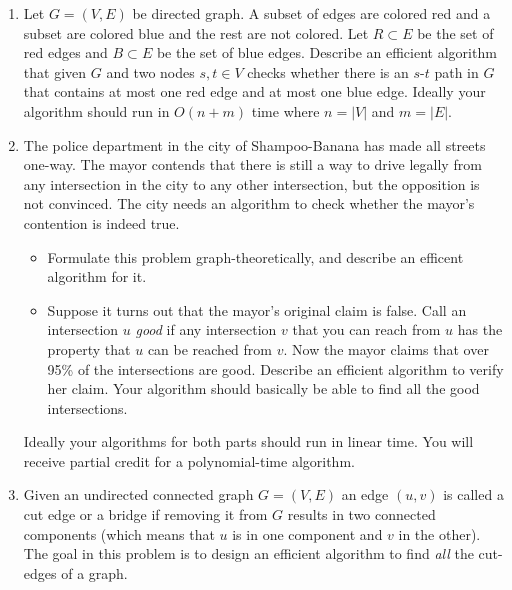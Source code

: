 \documentclass[11pt]{article}
\begin{document}
\begin{enumerate}


\item Let $G=(V,E)$ be directed graph. A subset of edges are colored
  red and a subset are colored blue and the rest are not colored.  Let
  $R \subset E$ be the set of red edges and $B \subset E$ be the set
  of blue edges.  Describe an efficient algorithm that given $G$ and
  two nodes $s,t \in V$ checks whether there is an $s$-$t$ path in $G$
  that contains at most one red edge and at most one blue edge. Ideally
  your algorithm should run in $O(n+m)$ time where $n = |V|$ and $m = |E|$.

\item The police department in the city of Shampoo-Banana has made all
  streets one-way. The mayor contends that there is still a way to
  drive legally from any intersection in the city to any other
  intersection, but the opposition is not convinced. The city needs an
  algorithm to check whether the mayor's contention is indeed true.
\begin{itemize}
\item Formulate this problem graph-theoretically, and
describe an efficent algorithm for it.
\item Suppose it turns out that the mayor’s original claim is
  false. Call an intersection $u$ {\em good} if any intersection $v$
  that you can reach from $u$ has the property that $u$ can be reached 
  from $v$. Now the mayor claims that over 95\% of the
  intersections are good.  Describe an efficient algorithm to verify
  her claim. Your algorithm should basically be able to find all the
  good intersections.
\end{itemize}
Ideally your algorithms for both parts should run in linear time. You will
receive partial credit for a polynomial-time algorithm.


\item Given an undirected connected graph $G=(V,E)$ an edge $(u,v)$ is
  called a cut edge or a bridge if removing it from $G$ results in
  two connected components (which means that $u$ is in one component
  and $v$ in the other). The goal in this problem is to design an efficient
  algorithm to find {\em all} the cut-edges of a graph.


\end{enumerate}
\end{document}
